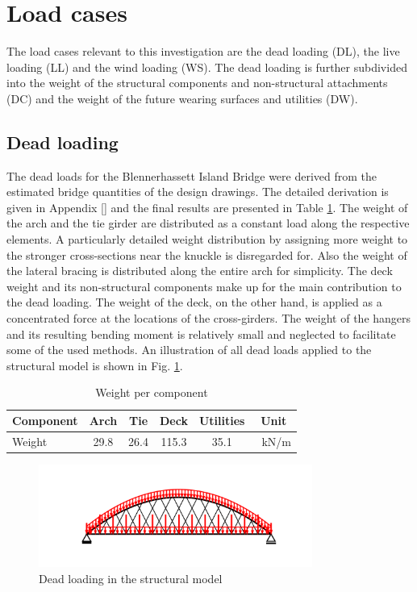 \newpage
\section{Load cases} \label{sec:met_loads}
The load cases relevant to this investigation are the dead loading (DL), the live loading (LL) and the wind loading (WS). The dead loading is further subdivided into the weight of the structural components and non-structural attachments (DC) and the weight of the future wearing surfaces and utilities (DW).

\subsection{Dead loading}
The dead loads for the Blennerhassett Island Bridge were derived from the estimated bridge quantities of the design drawings. The detailed derivation is given in Appendix [] and the final results are presented in Table \ref{tab:dead_loads}. The weight of the arch and the tie girder are distributed as a constant load along the respective elements. A particularly detailed weight distribution by assigning more weight to the stronger cross-sections near the knuckle is disregarded for. Also the weight of the lateral bracing is distributed along the entire arch for simplicity. The deck weight and its non-structural components make up for the main contribution to the dead loading. The weight of the deck, on the other hand, is applied as a concentrated force at the locations of the cross-girders. The weight of the hangers and its resulting bending moment is relatively small and neglected to facilitate some of the used methods. An illustration of all dead loads applied to the structural model is shown in Fig. \ref{fig:dead_loads}.

\begin{table}[H]
    \centering
    \begin{tabular}{lccccc}
        Component & Arch & Tie & Deck & Utilities & Unit \\ \hline
        Weight & 29.8 & 26.4 & 115.3 & 35.1 & \SI{}{kN/m}
    \end{tabular}
    \caption{Weight per component}
    \label{tab:dead_loads}
\end{table}

\begin{figure}[H]
    \centering
    \includegraphics[trim={0 0.8cm 0 0.8cm},clip,
    width=0.8\textwidth]{illustrations/figures/permanent loads.png}
    \caption{Dead loading in the structural model}
    \label{fig:dead_loads}
\end{figure}

